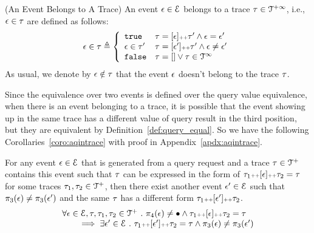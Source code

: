  \begin{defn}(An Event Belongs to A Trace)
 \label{def:event_belong}
An event $\mathtt{\epsilon} \in \mathcal{E}$ belongs to a trace $\mathtt{\tau} \in \mathcal{T}^{+\infty}$, i.e., $\mathtt{\epsilon} \in \mathtt{\tau}$ are defined as follows:
 \begin{equation*}
 \event \in \trace 
 \triangleq \left\{
 \begin{array}{ll} 
 \etrue & \trace = [\event] \tracecat \trace'
 \land \event = \event' \\
 \event \in \trace' & \trace = [\event'] \tracecat \trace'
 \land \event \neq \event' \\ 
 \efalse & \trace = [] \lor \trace \in \inftdom
 \end{array}
 \right.
 \end{equation*}
 As usual, we denote by $\mathtt{\epsilon} \notin \mathtt{\tau}$ that the event $\mathtt{\epsilon}$ doesn't belong to the trace $\mathtt{\tau}$.
 \end{defn}
Since the equivalence over two events is defined over the query value equivalence, 
when there is an event belonging to a trace, 
it is possible that 
the event showing up in the same trace has a different value of query result in the third position, 
but they are equivalent by Definition~\ref{def:query_equal}.
So we have the following Corollaries~\ref{coro:aqintrace} with proof in Appendix~\ref{apdx:aqintrace}.
\begin{coro}
\label{coro:aqintrace}
For any event $\mathtt{\epsilon} \in \mathcal{E}$ that is generated from a query request and a trace $\mathtt{\tau} \in \mathcal{T}^{+}$ contains this event
such that $\mathtt{\tau}$ can be expressed
in the form of $\mathtt{\tau}_1 {\scriptscriptstyle ++} [\mathtt{\epsilon}] {\scriptscriptstyle ++} \mathtt{\tau}_2 = \mathtt{\tau} $ for some traces $\mathtt{\tau}_1, \mathtt{\tau}_2 \in \mathcal{T}^{+}$,
then there exist another event $\mathtt{\epsilon}' \in \mathcal{E}$ such that $ \pi_3(\mathtt{\epsilon}) \neq \pi_3(\mathtt{\epsilon}') $
and the same $\mathtt{\tau}$ has a different form
$\mathtt{\tau}_1 {\scriptscriptstyle ++} [\mathtt{\epsilon}'] {\scriptscriptstyle ++} \mathtt{\tau}_2 $.
\[
 \begin{array}{l}
 \forall \mathtt{\epsilon} \in \mathcal{E}, \mathtt{\tau}, \mathtt{\tau}_1, \mathtt{\tau}_2 \in \mathcal{T}^{+} ~.~ 
 \pi_4(\mathtt{\epsilon}) \neq \bullet \land \mathtt{\tau}_1 {\scriptscriptstyle ++} [\mathtt{\epsilon}] {\scriptscriptstyle ++} \mathtt{\tau}_2 = \mathtt{\tau}
 \\ \qquad 
 \implies \exists 
 \mathtt{\epsilon}' \in \mathcal{E} ~.~ 
 \mathtt{\tau}_1 {\scriptscriptstyle ++} [\mathtt{\epsilon}'] {\scriptscriptstyle ++} \mathtt{\tau}_2 = \mathtt{\tau} \land \pi_3(\mathtt{\epsilon}) \neq \pi_3(\mathtt{\epsilon}') 
 \end{array}
\]
\end{coro}